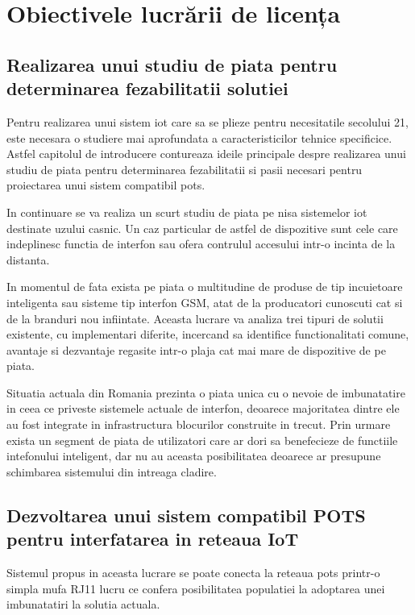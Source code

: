 \section {Obiectivele lucrării de licența}

\subsection {Realizarea unui studiu de piata pentru determinarea fezabilitatii solutiei}

Pentru realizarea unui sistem \acrfull{iot} care sa se plieze pentru necesitatile secolului 21, este necesara o studiere mai aprofundata a caracteristicilor tehnice specificice. Astfel capitolul de introducere contureaza ideile principale despre realizarea unui studiu de piata pentru determinarea fezabilitatii si pasii necesari pentru proiectarea unui sistem compatibil \acrshort{pots}.

In continuare se va realiza un scurt studiu de piata pe nisa sistemelor \acrshort{iot} destinate uzului casnic. Un caz particular de astfel de dispozitive sunt cele care indeplinesc functia de interfon sau ofera contrulul accesului intr-o incinta de la distanta.

In momentul de fata exista pe piata o multitudine de produse de tip incuietoare inteligenta sau sisteme tip interfon GSM, atat de la producatori cunoscuti cat si de la branduri nou infiintate. Aceasta lucrare va analiza trei tipuri de solutii existente, cu implementari diferite, incercand sa identifice functionalitati comune, avantaje si dezvantaje regasite intr-o plaja cat mai mare de dispozitive de pe piata.

Situatia actuala din Romania prezinta o piata unica cu o nevoie de imbunatatire in ceea ce priveste sistemele actuale de interfon, deoarece majoritatea dintre ele au fost integrate in infrastructura blocurilor construite in trecut. Prin urmare exista un segment de piata de utilizatori care ar dori sa benefecieze de functiile intefonului inteligent, dar nu au aceasta posibilitatea deoarece ar presupune schimbarea sistemului din intreaga cladire.


\subsection {Dezvoltarea unui sistem compatibil POTS pentru interfatarea in reteaua IoT}

Sistemul propus in aceasta lucrare se poate conecta la reteaua \acrfull{pots} printr-o simpla mufa RJ11 lucru ce confera posibilitatea populatiei la adoptarea unei imbunatatiri la solutia actuala.


